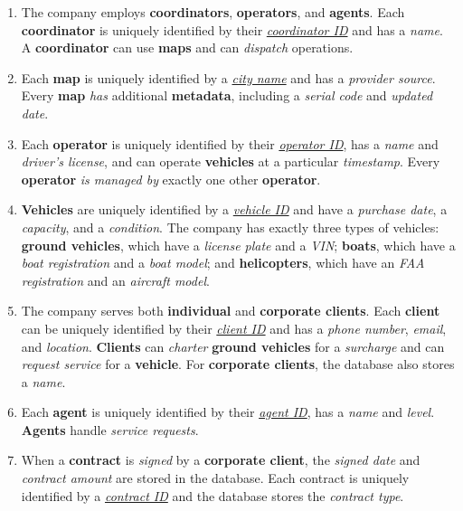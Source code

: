 \documentclass[12pt]{article}
\begin{document}
\begin{enumerate}[label=\textbf{\alph*.}]
    \item The company employs \textbf{coordinators}, \textbf{operators}, and \textbf{agents}. Each \textbf{coordinator} is uniquely identified by their \textit{\underline{coordinator ID}} and has a \textit{name}. A \textbf{coordinator} can use \textbf{maps} and can \textit{dispatch} operations.
    
    \item Each \textbf{map} is uniquely identified by a \textit{\underline{city name}} and has a \textit{provider source}. Every \textbf{map} \textit{has} additional \textbf{metadata}, including a \textit{serial code} and \textit{updated date}.
    
    \item Each \textbf{operator} is uniquely identified by their \textit{\underline{operator ID}}, has a \textit{name} and \textit{driver's license}, and can operate \textbf{vehicles} at a particular \textit{timestamp}. Every \textbf{operator} \textit{is managed by} exactly one other \textbf{operator}.
    
    \item \textbf{Vehicles} are uniquely identified by a \textit{\underline{vehicle ID}} and have a \textit{purchase date}, a \textit{capacity}, and a \textit{condition}. The company has exactly three types of vehicles: \textbf{ground vehicles}, which have a \textit{license plate} and a \textit{VIN}; \textbf{boats}, which have a \textit{boat registration} and a \textit{boat model}; and \textbf{helicopters}, which have an \textit{FAA registration} and an \textit{aircraft model}.
    
    \item The company serves both \textbf{individual} and \textbf{corporate clients}. Each \textbf{client} can be uniquely identified by their \textit{\underline{client ID}} and has a \textit{phone number}, \textit{email}, and \textit{location}. \textbf{Clients} can \textit{charter} \textbf{ground vehicles} for a \textit{surcharge} and can \textit{request service} for a \textbf{vehicle}. For \textbf{corporate clients}, the database also stores a \textit{name}.
    
    \item Each \textbf{agent} is uniquely identified by their \textit{\underline{agent ID}}, has a \textit{name} and \textit{level}. \textbf{Agents} handle \textit{service requests}.
    
    \item When a \textbf{contract} is \textit{signed} by a \textbf{corporate client}, the \textit{signed date} and \textit{contract amount} are stored in the database. Each contract is uniquely identified by a \textit{\underline{contract ID}} and the database stores the \textit{contract type}.
\end{enumerate}
\end{document}
